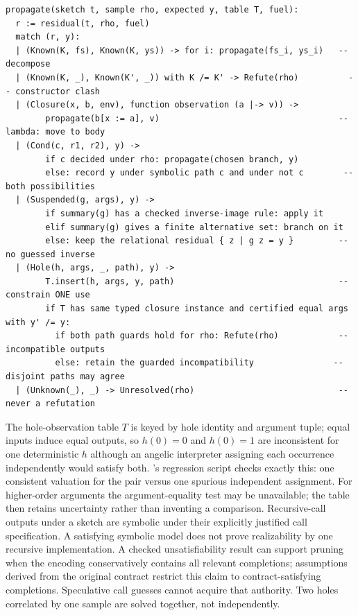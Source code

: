 \begin{lstlisting}
propagate(sketch t, sample rho, expected y, table T, fuel):
  r := residual(t, rho, fuel)
  match (r, y):
  | (Known(K, fs), Known(K, ys)) -> for i: propagate(fs_i, ys_i)   -- decompose
  | (Known(K, _), Known(K', _)) with K /= K' -> Refute(rho)          -- constructor clash
  | (Closure(x, b, env), function observation (a |-> v)) ->
        propagate(b[x := a], v)                                    -- lambda: move to body
  | (Cond(c, r1, r2), y) ->
        if c decided under rho: propagate(chosen branch, y)
        else: record y under symbolic path c and under not c        -- both possibilities
  | (Suspended(g, args), y) ->
        if summary(g) has a checked inverse-image rule: apply it
        elif summary(g) gives a finite alternative set: branch on it
        else: keep the relational residual { z | g z = y }         -- no guessed inverse
  | (Hole(h, args, _, path), y) ->
        T.insert(h, args, y, path)                                 -- constrain ONE use
        if T has same typed closure instance and certified equal args with y' /= y:
          if both path guards hold for rho: Refute(rho)            -- incompatible outputs
          else: retain the guarded incompatibility                -- disjoint paths may agree
  | (Unknown(_), _) -> Unresolved(rho)                             -- never a refutation
\end{lstlisting}
The hole-observation table $T$ is keyed by hole identity and argument tuple; equal inputs induce equal outputs, so $h(0)=0$ and $h(0)=1$ are inconsistent for one deterministic $h$ although an angelic interpreter assigning each occurrence independently would satisfy both. 's regression script checks exactly this: one consistent valuation for the pair versus one spurious independent assignment. For higher-order arguments the argument-equality test may be unavailable; the table then retains uncertainty rather than inventing a comparison. Recursive-call outputs under a sketch are symbolic under their explicitly justified call specification. A satisfying symbolic model does not prove realizability by one recursive implementation. A checked unsatisfiability result can support pruning when the encoding conservatively contains all relevant completions; assumptions derived from the original contract restrict this claim to contract-satisfying completions. Speculative call guesses cannot acquire that authority. Two holes correlated by one sample are solved together, not independently.

